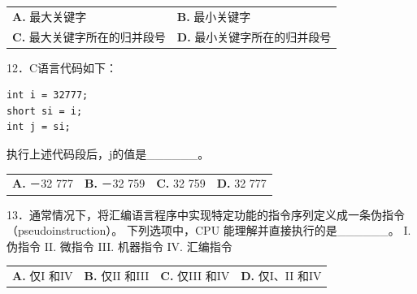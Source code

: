 \documentclass[UTF8,11pt]{ctexart}
\begin{document}
\begin{center}\begin{tabular}{>{\raggedright\arraybackslash}p{\dimexpr(\linewidth-4\tabcolsep)/2\relax}>{\raggedright\arraybackslash}p{\dimexpr(\linewidth-4\tabcolsep)/2\relax}}
\textbf{A.} 最大关键字 & \textbf{B.} 最小关键字\\[.35em]
\textbf{C.} 最大关键字所在的归并段号 & \textbf{D.} 最小关键字所在的归并段号\\[.35em]\end{tabular}\end{center}

12．C语言代码如下：


\begin{Verbatim}[breaklines,breakanywhere,fontsize=\small]
int i = 32777;
short si = i;
int j = si;
\end{Verbatim}

执行上述代码段后，j的值是\_\_\_\_\_\_。


\begin{center}\begin{tabular}{>{\raggedright\arraybackslash}p{\dimexpr(\linewidth-8\tabcolsep)/4\relax}>{\raggedright\arraybackslash}p{\dimexpr(\linewidth-8\tabcolsep)/4\relax}>{\raggedright\arraybackslash}p{\dimexpr(\linewidth-8\tabcolsep)/4\relax}>{\raggedright\arraybackslash}p{\dimexpr(\linewidth-8\tabcolsep)/4\relax}}
\textbf{A.} －32 777 & \textbf{B.} －32 759 & \textbf{C.} 32 759 & \textbf{D.} 32 777\\[.35em]\end{tabular}\end{center}

13．通常情况下，将汇编语言程序中实现特定功能的指令序列定义成一条伪指令（pseudoinstruction）。 下列选项中，CPU 能理解并直接执行的是\_\_\_\_\_\_。 I. 伪指令 II. 微指令 III. 机器指令 IV. 汇编指令


\begin{center}\begin{tabular}{>{\raggedright\arraybackslash}p{\dimexpr(\linewidth-8\tabcolsep)/4\relax}>{\raggedright\arraybackslash}p{\dimexpr(\linewidth-8\tabcolsep)/4\relax}>{\raggedright\arraybackslash}p{\dimexpr(\linewidth-8\tabcolsep)/4\relax}>{\raggedright\arraybackslash}p{\dimexpr(\linewidth-8\tabcolsep)/4\relax}}
\textbf{A.} 仅I 和IV & \textbf{B.} 仅II 和III & \textbf{C.} 仅III 和IV & \textbf{D.} 仅I、II 和IV\\[.35em]\end{tabular}\end{center}
\end{document}
